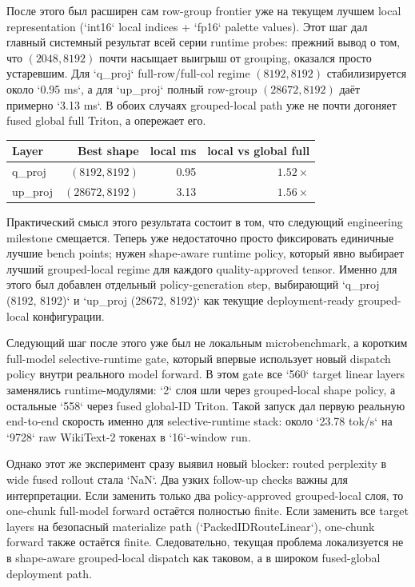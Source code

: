 После этого был расширен сам row-group frontier уже на текущем лучшем local
representation (`int16` local indices + `fp16` palette values). Этот шаг дал
главный системный результат всей серии runtime probes: прежний вывод о том, что
$(2048, 8192)$ почти насыщает выигрыш от grouping, оказался просто устаревшим.
Для `q\_proj` full-row/full-col regime $(8192, 8192)$ стабилизируется около
`0.95 ms`, а для `up\_proj` полный row-group $(28672, 8192)$ даёт примерно
`3.13 ms`. В обоих случаях grouped-local path уже не почти догоняет fused
global full Triton, а опережает его.

\begin{center}
\begin{tabular}{lrrr}
\toprule
Layer & Best shape & local ms & local vs global full \\
\midrule
q\_proj & $(8192, 8192)$ & 0.95 & $1.52\times$ \\
up\_proj & $(28672, 8192)$ & 3.13 & $1.56\times$ \\
\bottomrule
\end{tabular}
\end{center}

Практический смысл этого результата состоит в том, что следующий engineering
milestone смещается. Теперь уже недостаточно просто фиксировать единичные лучшие
bench points; нужен shape-aware runtime policy, который явно выбирает лучший
grouped-local regime для каждого quality-approved tensor. Именно для этого был
добавлен отдельный policy-generation step, выбирающий
`q\_proj \rightarrow (8192, 8192)` и `up\_proj \rightarrow (28672, 8192)` как
текущие deployment-ready grouped-local конфигурации.

Следующий шаг после этого уже был не локальным microbenchmark, а коротким
full-model selective-runtime gate, который впервые использует новый dispatch
policy внутри реального model forward. В этом gate все `560` target linear
layers заменялись runtime-модулями: `2` слоя шли через grouped-local shape
policy, а остальные `558` через fused global-ID Triton. Такой запуск дал первую
реальную end-to-end скорость именно для selective-runtime stack: около
`23.78 tok/s` на `9728` raw WikiText-2 токенах в `16`-window run.

Однако этот же эксперимент сразу выявил новый blocker: routed perplexity в wide
fused rollout стала `NaN`. Два узких follow-up checks важны для интерпретации.
Если заменить только два policy-approved grouped-local слоя, то one-chunk
full-model forward остаётся полностью finite. Если заменить все target layers на
безопасный materialize path (`PackedIDRouteLinear`), one-chunk forward также
остаётся finite. Следовательно, текущая проблема локализуется не в shape-aware
grouped-local dispatch как таковом, а в широком fused-global deployment path.

